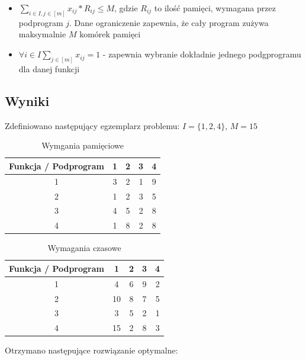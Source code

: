 \documentclass[12pt, a4paper]{article}
\begin{document}
\begin{itemize}
    \item {$\displaystyle\sum_{i \in I, j \in [m]} x_{ij} * R_{ij} \leq M$}, gdzie $R_{ij}$ to ilość pamięci, wymagana przez podprogram $j$. Dane ograniczenie zapewnia, że cały program zużywa maksymalnie $M$ komórek pamięci
    \item {$\forall{i \in I}\displaystyle\sum_{j \in [m]} x_{ij} = 1$} - zapewnia wybranie dokładnie jednego podgprogramu dla danej funkcji
\end{itemize}

\subsection{Wyniki}

Zdefiniowano następujący egzemplarz problemu:
$I = \{1, 2, 4\}$, $M = 15$

\begin{table}[H]
\begin{center}
\begin{tabular}{|c|c|c|c|c|}
  \hline
  Funkcja / Podprogram & 1 & 2 & 3 & 4 \\
  \hline
  1 & 3 & 2 & 1 & 9 \\
  \hline
  2 & 1 & 2 & 3 & 5 \\
  \hline
  3 & 4 & 5 & 2 & 8 \\
  \hline
  4 & 1 & 8 & 2 & 8 \\
  \hline
\end{tabular} 
\caption{Wymgania pamięciowe}
\end{center}
\end{table}

\begin{table}[H]
\begin{center}
\begin{tabular}{|c|c|c|c|c|}
  \hline
  Funkcja / Podprogram & 1 & 2 & 3 & 4 \\
  \hline
  1 & 4 & 6 & 9 & 2 \\
  \hline
  2 & 10 & 8 & 7 & 5 \\
  \hline
  3 & 3 & 5 & 2 & 1 \\
  \hline
  4 & 15 & 2 & 8 & 3 \\
  \hline
\end{tabular} 
\caption{Wymagania czasowe}
\end{center}
\end{table}

Otrzymano następujące rozwiązanie optymalne:
\end{document}
